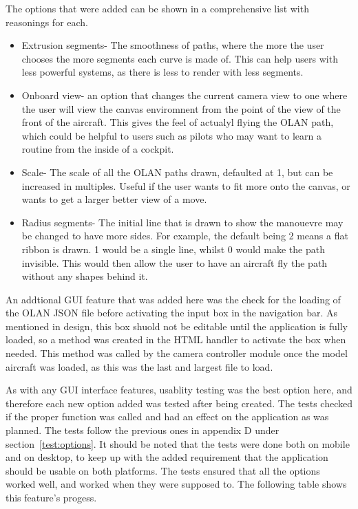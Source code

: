 The options that were added can be shown in a comprehensive list with reasonings for each.
\begin{itemize}
	\item Extrusion segments- The smoothness of paths, where the more the user chooses the more segments each curve is made of. This can help users with less powerful systems, as there is less to render with less segments.
	\item Onboard view- an option that changes the current camera view to one where the user will view the canvas enviromnent from the point of the view of the front of the aircraft. This gives the feel of actualyl flying the OLAN path, which could be helpful to users such as pilots who may want to learn a routine from the inside of a cockpit.
	\item Scale- The scale of all the OLAN paths drawn, defaulted at 1, but can be increased in multiples. Useful if the user wants to fit more onto the canvas, or wants to get a larger better view of a move.
	\item Radius segments- The initial line that is drawn to show the manouevre may be changed to have more sides. For example, the default being 2 means a flat ribbon is drawn. 1 would be a single line, whilst 0 would make the path invisible. This would then allow the user to have an aircraft fly the path without any shapes behind it.
\end{itemize}

An addtional GUI feature that was added here was the check for the loading of the OLAN JSON file before activating the input box in the navigation bar. As mentioned in design, this box shuold not be editable until the application is fully loaded, so a method was created in the HTML handler to activate the box when needed. This method was called by the camera controller module once the model aircraft was loaded, as this was the last and largest file to load.

As with any GUI interface features, usablity testing was the best option here, and therefore each new option added was tested after being created. The tests checked if the proper function was called and had an effect on the application as was planned. The tests follow the previous ones in appendix D under section~\ref{test:options}. It should be noted that the tests were done both on mobile and on desktop, to keep up with the added requirement that the application should be usable on both platforms. The tests ensured that all the options worked well, and worked when they were supposed to. The following table shows this feature's progess.

